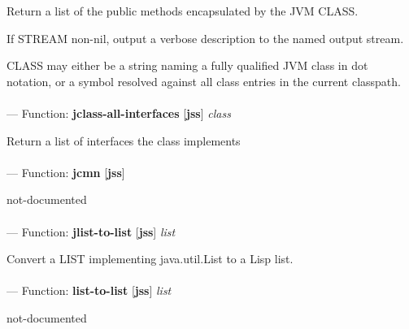 \begin{adjustwidth}{5em}{5em}
Return a list of the public methods encapsulated by the JVM CLASS.

If STREAM non-nil, output a verbose description to the named output stream.

CLASS may either be a string naming a fully qualified JVM class in dot
notation, or a symbol resolved against all class entries in the
current classpath.
\end{adjustwidth}

\paragraph{}
\label{JSS:JCLASS-ALL-INTERFACES}
--- Function: \textbf{jclass-all-interfaces} [\textbf{jss}] \textit{class}

\begin{adjustwidth}{5em}{5em}
Return a list of interfaces the class implements
\end{adjustwidth}

\paragraph{}
\label{JSS:JCMN}
--- Function: \textbf{jcmn} [\textbf{jss}] \textit{}

\begin{adjustwidth}{5em}{5em}
not-documented
\end{adjustwidth}

\paragraph{}
\label{JSS:JLIST-TO-LIST}
--- Function: \textbf{jlist-to-list} [\textbf{jss}] \textit{list}

\begin{adjustwidth}{5em}{5em}
Convert a LIST implementing java.util.List to a Lisp list.
\end{adjustwidth}

\paragraph{}
\label{JSS:LIST-TO-LIST}
--- Function: \textbf{list-to-list} [\textbf{jss}] \textit{list}

\begin{adjustwidth}{5em}{5em}
not-documented
\end{adjustwidth}

